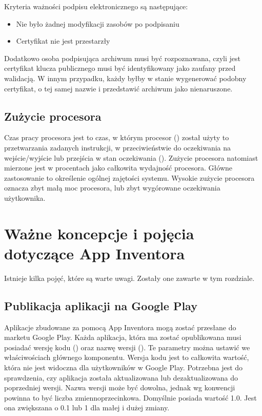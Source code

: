 Kryteria ważności podpisu elektronicznego są następujące:\cite{android:58}
\begin{itemize}
\item Nie było żadnej modyfikacji zasobów po podpisaniu
\item Certyfikat nie jest przestarzły
\end{itemize}

Dodatkowo osoba podpisująca archiwum musi być rozpoznawana, czyli jest certyfikat klucza publicznego musi być identyfikowany jako zaufany przed walidacją. W innym przypadku, każdy byłby w stanie wygenerować podobny certyfikat, o tej samej nazwie i przedstawić archiwum jako nienaruszone.\cite{android:58}


\subsection{Zużycie procesora}

Czas pracy procesora jest to czas, w którym procesor () został użyty to przetwarzania zadanych instrukcji, w przeciwieństwie do oczekiwania na wejście/wyjście lub przejścia w stan oczekiwania (). Zużycie procesora natomiast mierzone jest w procentach jako całkowita wydajność procesora. Główne zastosowanie to określenie ogólnej zajętości systemu. Wysokie zużycie procesora oznacza zbyt małą moc procesora, lub zbyt wygórowane oczekiwania użytkownika.


\section{Ważne koncepcje i pojęcia dotyczące App Inventora}

Istnieje kilka pojęć, które są warte uwagi. Zostały one zawarte w tym rozdziale.

\subsection{Publikacja aplikacji na Google Play}

Aplikacje zbudowane za pomocą App Inventora mogą zostać przesłane do marketu Google Play. Każda aplikacja, która ma zostać opublikowana musi posiadać wersję kodu () oraz nazwę wersji (). Te parametry można ustawić we właściwościach głównego komponentu\cite{doc:concepts}. Wersja kodu jest to całkowita wartość, która nie jest widoczna dla użytkowników w Google Play. Potrzebna jest do sprawdzenia, czy aplikacja została aktualizowana lub dezaktualizowana do poprzedniej wersji. Nazwa wersji może być dowolna, jednak wg konwencji powinna to być liczba zmiennoprzecinkowa. Domyślnie posiada wartość 1.0. Jest ona zwiększana o 0.1 lub 1 dla małej i dużej zmiany.

